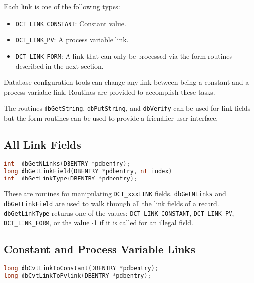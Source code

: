 Each link is one of the following types:

\begin{itemize}
\item {}\verb|DCT_LINK_CONSTANT|: Constant value.

\item {}\verb|DCT_LINK_PV|: A process variable link.

\item {}\verb|DCT_LINK_FORM|: A link that can only be processed via the form routines described in the next section.

\end{itemize}

Database configuration tools can change any link between being a constant and a process variable link.
Routines are provided to accomplish these tasks.

The routines \verb|dbGetString|, \verb|dbPutString|, and \verb|dbVerify| can be used for link fields but the form routines can be used to provide a friendlier user interface.

\subsection{All Link Fields}

\begin{lstlisting}[language=C]
int  dbGetNLinks(DBENTRY *pdbentry);
long dbGetLinkField(DBENTRY *pdbentry,int index)
int  dbGetLinkType(DBENTRY *pdbentry);
\end{lstlisting}

These are routines for manipulating \verb|DCT_xxxLINK| fields. \verb|dbGetNLinks| and \verb|dbGetLinkField| are used to walk 
through all the link fields of a record. \verb|dbGetLinkType| returns one of the values: \verb|DCT_LINK_CONSTANT|, 
\verb|DCT_LINK_PV|, \verb|DCT_LINK_FORM|, or the value -1 if it is called for an illegal field.

\subsection{Constant and Process Variable Links}

\begin{lstlisting}[language=C]
long dbCvtLinkToConstant(DBENTRY *pdbentry);
long dbCvtLinkToPvlink(DBENTRY *pdbentry);
\end{lstlisting}

